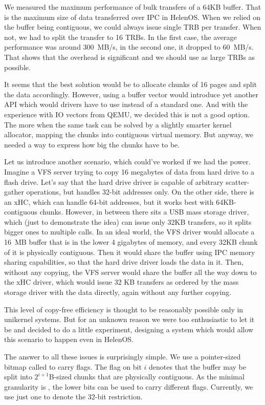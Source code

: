 We measured the maximum performance of bulk transfers of a 64KB buffer. That is
the maximum size of data transferred over IPC in HelenOS. When we relied on the
buffer being contiguous, we could always issue single TRB per transfer. When
not, we had to split the transfer to 16 TRBs. In the first case, the average
performance was around 300~MB/s, in the second one, it dropped to 60~MB/s. That
shows that the overhead is significant and we should use as large TRBs as
possible.

It seems that the best solution would be to allocate chunks of 16 pages and
split the data accordingly. However, using a buffer vector would introduce yet
another API which would drivers have to use instead of a standard one. And with
the experience with IO vectors from QEMU, we decided this is not a good option.
The more when the same task can be solved by a slightly smarter kernel
allocator, mapping the chunks into contiguous virtual memory. But anyway, we
needed a way to express how big the chunks have to be.

Let us introduce another scenario, which could've worked if we had the power.
Imagine a VFS server trying to copy 16 megabytes of data from hard drive to
a flash drive. Let's say that the hard drive driver is capable of arbitrary
scatter-gather operations, but handles 32-bit addresses only. On the other
side, there is an xHC, which can handle 64-bit addresses, but it works best
with 64KB-contiguous chunks. However, in between there sits a USB mass storage
driver, which (just to demonstrate the idea) can issue only 32KB transfers,
so it splits bigger ones to multiple calls. In an ideal world, the VFS driver
would allocate a 16~MB buffer that is in the lower 4 gigabytes of memory, and
every 32KB chunk of it is physically contiguous. Then it would share the buffer
using IPC memory sharing capabilities, so that the hard drive driver loads the
data in it. Then, without any copying, the VFS server would share the buffer
all the way down to the xHC driver, which would issue 32 KB transfers as
ordered by the mass storage driver with the data directly, again without any
further copying.

This level of copy-free efficiency is thought to be reasonably possible only in
unikernel systems. But for an unknown reason we were too enthusiastic to let
it be and decided to do a little experiment, designing a system which would
allow this scenario to happen even in HelenOS.

The answer to all these issues is surprisingly simple. We use a pointer-sized
bitmap called  to carry flags. The flag on bit $i$ denotes
that the buffer may be split into $2^{i+1}$B-sized chunks that are physically
contiguous. As the minimal granularity is , the lower bits can
be used to carry different flags. Currently, we use just one to denote the
32-bit restriction.

